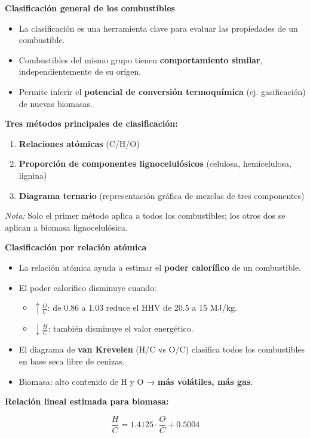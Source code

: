 \documentclass[../../main.tex]{subfiles}
\begin{document}
\begin{frame}{\textbf{Clasificación general de los combustibles}}
\begin{itemize}
  \item La clasificación es una herramienta clave para evaluar las propiedades de un combustible.
  \item Combustibles del mismo grupo tienen \textbf{comportamiento similar}, independientemente de su origen.
  \item Permite inferir el \textbf{potencial de conversión termoquímica} (ej. gasificación) de nuevas biomasas.
\end{itemize}

\textbf{Tres métodos principales de clasificación:}
\begin{enumerate}
  \item \textbf{Relaciones atómicas} (C/H/O)
  \item \textbf{Proporción de componentes lignocelulósicos} (celulosa, hemicelulosa, lignina)
  \item \textbf{Diagrama ternario} (representación gráfica de mezclas de tres componentes)
\end{enumerate}

\textit{Nota:} Solo el primer método aplica a todos los combustibles; los otros dos se aplican a biomasa lignocelulósica.
\end{frame}

\begin{frame}{\textbf{Clasificación por relación atómica}}
\begin{itemize}
  \item La relación atómica ayuda a estimar el \textbf{poder calorífico} de un combustible.
  \item El poder calorífico disminuye cuando:
  \begin{itemize}
    \item \( \uparrow \frac{O}{C} \): de 0.86 a 1.03 reduce el HHV de 20.5 a 15 MJ/kg.
    \item \(\downarrow\frac{H}{C} \): también disminuye el valor energético.
  \end{itemize}
  \item El diagrama de \textbf{van Krevelen} (H/C vs O/C) clasifica todos los combustibles en base seca libre de cenizas.
  \item Biomasa: alto contenido de H y O → \textbf{más volátiles, más gas}.
\end{itemize}

\vspace{0.5em}
\textbf{Relación lineal estimada para biomasa:}

\[
\frac{H}{C} = 1.4125 \cdot \frac{O}{C} + 0.5004
\]
\end{frame}
\end{document}
